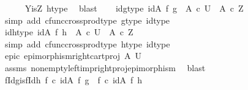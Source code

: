 \begin{isabellebody}
\ \ \ \ \isamarkupfalse%
\ Y{\isacharunderscore}{\kern0pt}is{\isacharunderscore}{\kern0pt}Z\ h{\isacharunderscore}{\kern0pt}type\ \isamarkupfalse%
\ blast\isanewline
\ \ \isamarkupfalse%
\ idg{\isacharunderscore}{\kern0pt}type{\isacharcolon}{\kern0pt}\ {\isachardoublequoteopen}{\isacharparenleft}{\kern0pt}id{\isacharparenleft}{\kern0pt}A{\isacharparenright}{\kern0pt}\ {\isasymtimes}\isactrlsub f\ g{\isacharparenright}{\kern0pt}\ {\isacharcolon}{\kern0pt}\ A\ {\isasymtimes}\isactrlsub c\ U\ {\isasymrightarrow}\ A\ {\isasymtimes}\isactrlsub c\ Z{\isachardoublequoteclose}\isanewline
\ \ \ \ \isamarkupfalse%
\ {\isacharparenleft}{\kern0pt}simp\ add{\isacharcolon}{\kern0pt}\ cfunc{\isacharunderscore}{\kern0pt}cross{\isacharunderscore}{\kern0pt}prod{\isacharunderscore}{\kern0pt}type\ g{\isacharunderscore}{\kern0pt}type{}\ id{\isacharunderscore}{\kern0pt}type{\isacharparenright}{\kern0pt}\isanewline
\ \ \isamarkupfalse%
\ idh{\isacharunderscore}{\kern0pt}type{\isacharcolon}{\kern0pt}\ {\isachardoublequoteopen}{\isacharparenleft}{\kern0pt}id{\isacharparenleft}{\kern0pt}A{\isacharparenright}{\kern0pt}\ {\isasymtimes}\isactrlsub f\ h{\isacharparenright}{\kern0pt}\ {\isacharcolon}{\kern0pt}\ A\ {\isasymtimes}\isactrlsub c\ U\ {\isasymrightarrow}\ A\ {\isasymtimes}\isactrlsub c\ Z{\isachardoublequoteclose}\isanewline
\ \ \ \ \isamarkupfalse%
\ {\isacharparenleft}{\kern0pt}simp\ add{\isacharcolon}{\kern0pt}\ cfunc{\isacharunderscore}{\kern0pt}cross{\isacharunderscore}{\kern0pt}prod{\isacharunderscore}{\kern0pt}type\ h{\isacharunderscore}{\kern0pt}type{}\ id{\isacharunderscore}{\kern0pt}type{\isacharparenright}{\kern0pt}\isanewline
\isanewline
\ \ \ \isamarkupfalse%
\ \isamarkupfalse%
\ epic{\isacharcolon}{\kern0pt}\ {\isachardoublequoteopen}epimorphism{\isacharparenleft}{\kern0pt}right{\isacharunderscore}{\kern0pt}cart{\isacharunderscore}{\kern0pt}proj\ A\ U{\isacharparenright}{\kern0pt}{\isachardoublequoteclose}\isanewline
\ \ \ \ \ \isamarkupfalse%
\ assms{\isacharparenleft}{\kern0pt}{}{\isacharparenright}{\kern0pt}\ nonempty{\isacharunderscore}{\kern0pt}left{\isacharunderscore}{\kern0pt}imp{\isacharunderscore}{\kern0pt}right{\isacharunderscore}{\kern0pt}proj{\isacharunderscore}{\kern0pt}epimorphism\ \isamarkupfalse%
\ blast\isanewline
\isanewline
\ \ \ \isamarkupfalse%
\ fIdg{\isacharunderscore}{\kern0pt}is{\isacharunderscore}{\kern0pt}fIdh{\isacharcolon}{\kern0pt}\ {\isachardoublequoteopen}f\ {\isasymcirc}\isactrlsub c\ {\isacharparenleft}{\kern0pt}id{\isacharparenleft}{\kern0pt}A{\isacharparenright}{\kern0pt}\ {\isasymtimes}\isactrlsub f\ g{\isacharparenright}{\kern0pt}\ {\isacharequal}{\kern0pt}\ f\ {\isasymcirc}\isactrlsub c\ {\isacharparenleft}{\kern0pt}id{\isacharparenleft}{\kern0pt}A{\isacharparenright}{\kern0pt}\ {\isasymtimes}\isactrlsub f\ h{\isacharparenright}{\kern0pt}{\isachardoublequoteclose}\isanewline

\end{isabellebody}
